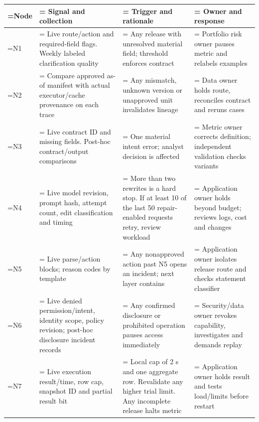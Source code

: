 \documentclass[11pt,a4paper,onecolumn,oneside]{rho-class/rho}
\begin{document}
{\setlength{\tabcolsep}{6pt}
\renewcommand{\arraystretch}{1.35}
\begin{table}[H]
\centering
\small
\begin{tabularx}{\linewidth}{@{}>{\hsize=0.400\hsize\linewidth=\hsize\RaggedRight\arraybackslash}X>{\hsize=1.200\hsize\linewidth=\hsize\RaggedRight\arraybackslash}X>{\hsize=1.240\hsize\linewidth=\hsize\RaggedRight\arraybackslash}X>{\hsize=1.160\hsize\linewidth=\hsize\RaggedRight\arraybackslash}X@{}}
\toprule
\textbf{Node} & \textbf{Signal and collection} & \textbf{Trigger and rationale} & \textbf{Owner and response} \\ \midrule
N1 & Live route/action and required-field flags. Weekly labeled clarification quality & Any release with unresolved material field; threshold enforces contract & Portfolio risk owner pauses metric and relabels examples \\
N2 & Compare approved as-of manifest with actual executor/cache provenance on each trace & Any mismatch, unknown version or unapproved unit invalidates lineage & Data owner holds route, reconciles contract and reruns cases \\
N3 & Live contract ID and missing fields. Post-hoc contract/output comparisons & One material intent error; analyst decision is affected & Metric owner corrects definition; independent validation checks variants \\
N4 & Live model revision, prompt hash, attempt count, edit classification and timing & More than two rewrites is a hard stop. If at least 10 of the last 50 repair-enabled requests retry, review workload & Application owner holds beyond budget; reviews logs, cost and changes \\
N5 & Live parse/action blocks; reason codes by template & Any nonapproved action past N5 opens an incident; next layer contains & Application owner isolates release route and checks statement classifier \\
N6 & Live denied permission/intent, identity scope, policy revision; post-hoc disclosure incident records & Any confirmed disclosure or prohibited operation pauses access immediately & Security/data owner revokes capability, investigates and demands replay \\
N7 & Live execution result/time, row cap, snapshot ID and partial result bit & Local cap of 2 s and one aggregate row. Revalidate any higher trial limit. Any incomplete release halts metric & Application owner holds result and tests load/limits before restart \\

\end{tabularx}
\end{table}}
\end{document}
